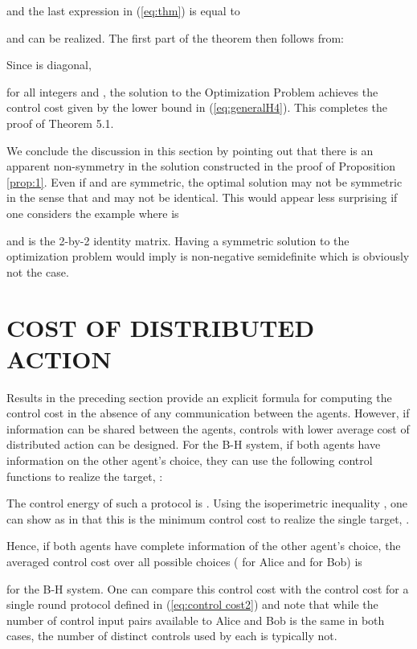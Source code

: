 \documentclass[12pt,onecolumn,draftcls]{IEEEtran}
\begin{document}
and the last expression in (\ref{eq:thm}) is equal to

and can be realized.
The first part of the theorem then follows from:



Since  is diagonal, 

for all integers  and ,
the solution to the Optimization Problem  achieves the control cost given by the lower bound in (\ref{eq:generalH4}).  This completes the proof of Theorem 5.1. 
\hfill 

We conclude the discussion in this section by pointing out that there is an apparent non-symmetry in the solution constructed in
the proof of Proposition \ref{prop:1}.   Even if  and  are symmetric, the optimal solution may not be symmetric
in the sense that  and  may not be identical.  This would appear less surprising if one considers
the example where  is

and  is the 2-by-2 identity matrix.  Having a symmetric solution to the optimization problem
would imply  is non-negative semidefinite which is obviously not the case.  

\section{COST OF DISTRIBUTED ACTION}\setcounter{equation}{0}

Results in the preceding section provide an explicit formula for computing the control cost in the absence of
any communication between the agents.  However, if information can be shared between the agents, controls with lower average cost of distributed action can be designed.   For the B-H system, if both agents have information on the other agent's choice, they can use the following control functions to realize the target, :

The control energy of such a protocol is 
.
Using the isoperimetric inequality \cite{Os}, one can show as in \cite{WB} that this is the minimum
control cost to realize the single target, .

Hence, if both agents have complete information of the other agent's choice,
the averaged control cost over all possible choices ( for Alice and  for Bob) is

for the B-H system.
One can compare this control cost with the control cost for a single round protocol defined in (\ref{eq:control cost2}) and note
that while the number of control input pairs available to Alice and Bob is the same in both cases, the number of distinct controls used by each is typically not.
\end{document}
